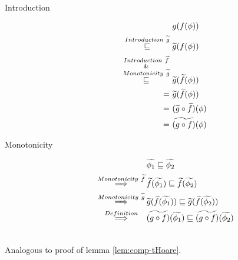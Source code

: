 \begin{proofatend}~
    \begin{description}
        \item[Introduction]
        \begin{align*}
        &g(f(\phi))\\
        \overset{Introduction~\widetilde{g}}{\sqsubseteq}~
        &\widetilde{g}(f(\phi))\\
        \overset{\substack{Introduction~\widetilde{f}\\\&\\Monotonicity~\widetilde{g}}}{\sqsubseteq}~
        &\widetilde{g}(\widetilde{f}(\phi))\\
        =~
        &\widetilde{g}(\widetilde{f}(\phi))\\
        =~
        &(\widetilde{g} \circ \widetilde{f})(\phi)\\
        =~
        &\widetilde{(g \circ f)}(\phi)
        \end{align*}
        
        \item[Monotonicity]
        \begin{align*}
        &\widetilde{\phi_1} \sqsubseteq \widetilde{\phi_2}\\
        \overset{Monotonicity~\widetilde{f}}{\quad\quad\implies\quad\quad}
        &\widetilde{f}(\widetilde{\phi_1}) \sqsubseteq \widetilde{f}(\widetilde{\phi_2})\\
        \overset{Monotonicity~\widetilde{g}}{\quad\quad\implies\quad\quad}
        &\widetilde{g}(\widetilde{f}(\widetilde{\phi_1})) \sqsubseteq \widetilde{g}(\widetilde{f}(\widetilde{\phi_2}))\\
        \overset{Definition}{\quad\quad\implies\quad\quad}
        &\widetilde{(g \circ f)}(\widetilde{\phi_1}) \sqsubseteq \widetilde{(g \circ f)}(\widetilde{\phi_2})
        \end{align*}
    \end{description}
\end{proofatend}

\begin{proofatend}~\\
    Analogous to proof of lemma \ref{lem:comp-tHoare}.
\end{proofatend}

